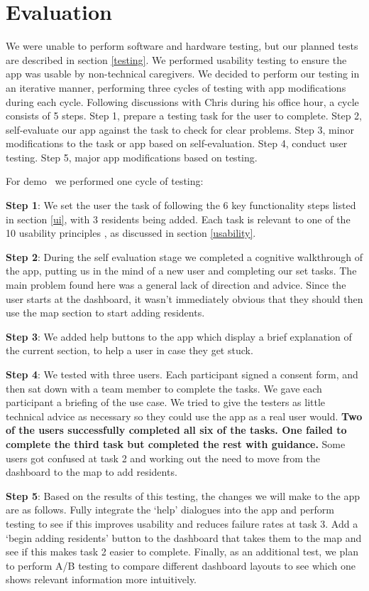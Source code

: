 \documentclass{article}
\begin{document}
\section{Evaluation}
We were unable to perform software and hardware testing, but our planned tests are described in section \ref{testing}. 
We performed usability testing to ensure the app was usable by non-technical caregivers. We decided to perform our testing in an iterative manner, performing three cycles of testing with app modifications during each cycle. Following discussions with Chris during his office hour, a cycle consists of 5 steps.
Step 1, prepare a testing task for the user to complete.
Step 2, self-evaluate our app against the task to check for clear problems.
Step 3, minor modifications to the task or app based on self-evaluation.
Step 4, conduct user testing.
Step 5, major app modifications based on testing.

For demo \demoNumber\ we performed one cycle of testing:

{\bf Step 1}: We set the user the task of following the 6 key functionality steps listed in section \ref{ui}, with 3 residents being added. Each task is relevant to one of the 10 usability principles \cite{heuristics}, as discussed in section \ref{usability}.

{\bf Step 2}: During the self evaluation stage we completed a cognitive walkthrough of the app, putting us in the mind of a new user and completing our set tasks. The main problem found here was a general lack of direction and advice. Since the user starts at the dashboard, it wasn't immediately obvious that they should then use the map section to start adding residents.

{\bf Step 3}: We added help buttons to the app which display a brief explanation of the current section, to help a user in case they get stuck.

{\bf Step 4}: We tested with three users. Each participant signed a consent form, and then sat down with a team member to complete the tasks. We gave each participant a briefing of the use case. We tried to give the testers as little technical advice as necessary so they could use the app as a real user would. {\bf Two of the users successfully completed all six of the tasks. One failed to complete the third task but completed the rest with guidance.} Some users got confused at task 2 and working out the need to move from the dashboard to the map to add residents.

{\bf Step 5}: Based on the results of this testing, the changes we will make to the app are as follows. Fully integrate the `help' dialogues into the app and perform testing to see if this improves usability and reduces failure rates at task 3. Add a `begin adding residents' button to the dashboard that takes them to the map and see if this makes task 2 easier to complete. Finally, as an additional test, we plan to perform A/B testing to compare different dashboard layouts to see which one shows relevant information more intuitively. 
\end{document}
